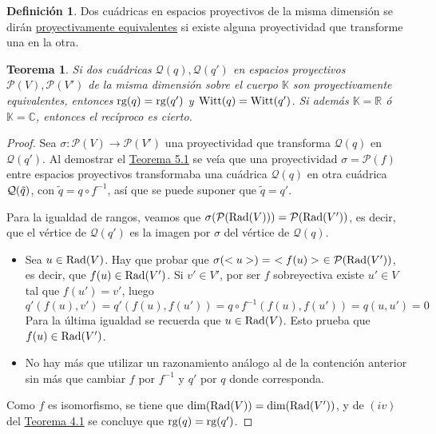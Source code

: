 \documentclass[12pt]{report}
\newtheorem{theorem}{Teorema}[chapter]
\theoremstyle{definition}
\newtheorem{definition}{Definición}[chapter]
\theoremstyle{definition}
\theoremstyle{remark}
\newcommand{\R}{\mathbb R}
\begin{document}
\begin{definition}
Dos cuádricas en espacios proyectivos de la misma dimensión se dirán \ul{proyectivamente equivalentes} si existe alguna proyectividad que transforme una en la otra.
\end{definition}

\begin{theorem}
\label{teo5.7.}
Si dos cuádricas $\mathcal{Q}(q), \mathcal{Q}(q')$ en espacios proyectivos $\mathcal{P}(V), \mathcal
P(V')$ de la misma dimensión sobre el cuerpo $\mathbb{K}$ son proyectivamente equivalentes, entonces $\textup{rg}(q) = \textup{rg}(q')$ y $\textup{Witt}(q) = \textup{Witt}(q')$. Si además $\mathbb{K} = \R$ ó $\mathbb{K} = \mathbb{C}$, entonces el recíproco es cierto.
\end{theorem}

\begin{proof}
Sea $\sigma \colon \mathcal{P}(V) \to \mathcal{P}(V')$ una proyectividad que transforma $\mathcal{Q}(q)$ en $\mathcal{Q}(q')$. Al demostrar el \hyperref[teo5.1.]{\color{blue}Teorema 5.1} se veía que una proyectividad $\sigma = \mathcal{P}(f)$ entre espacios proyectivos transformaba una cuádrica $\mathcal{Q}(q)$ en otra cuádrica $\mathcal{Q}(\Tilde{q})$, con $\tilde{q} = q \circ f^{-1}$, así que se puede suponer que $\tilde{q} = q'$.

\vspace{2mm}
Para la igualdad de rangos, veamos que $\sigma(\mathcal{P}(\textup{Rad}(V))) = \mathcal{P}(\textup{Rad}(V'))$, es decir, que el vértice de $\mathcal{Q}(q')$ es la imagen por $\sigma$ del vértice de $\mathcal{Q}(q)$.
\begin{itemize}
    \item[{\fbox[rb]{$\subset$}}] Sea $u \in \textup{Rad}(V)$. Hay que probar que $\sigma(<u>) = \ <f(u)> \ \in \mathcal{P}(\textup{Rad}(V'))$, es decir, que $f(u) \in \textup{Rad}(V')$. Si $v' \in V'$, por ser $f$ sobreyectiva existe $u' \in V$ tal que $f(u') = v'$, luego
    \[q'(f(u),v') = q'(f(u),f(u')) = q \circ f^{-1}(f(u),f(u')) = q(u,u') = 0\]
    Para la última igualdad se recuerda que $u \in \textup{Rad}(V)$. Esto prueba que $f(u) \in \textup{Rad}(V')$.
    \item[{\fbox[rb]{$\supset$}}] No hay más que utilizar un razonamiento análogo al de la contención anterior sin más que cambiar $f$ por $f^{-1}$ y $q'$ por $q$ donde corresponda.
\end{itemize}

Como $f$ es isomorfismo, se tiene que $\textup{dim}(\textup{Rad}(V)) = \textup{dim}(\textup{Rad}(V'))$, y de $(iv)$ del \hyperref[teo4.1.]{\color{blue}Teorema 4.1} se concluye que $\textup{rg}(q) = \textup{rg}(q')$.


\end{proof}
\end{document}
